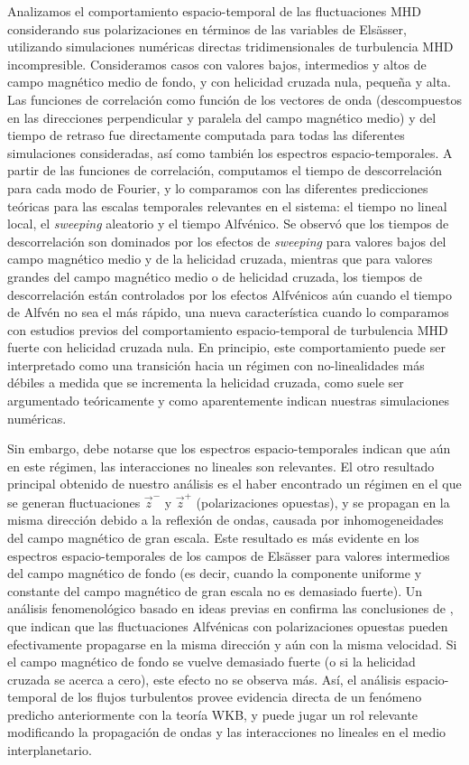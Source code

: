 Analizamos el comportamiento espacio-temporal de las fluctuaciones MHD
considerando sus polarizaciones en términos de las variables de
Els\"asser, utilizando simulaciones numéricas directas
tridimensionales de turbulencia MHD incompresible. Consideramos casos
con valores bajos, intermedios y altos de campo magnético medio de
fondo, y con helicidad cruzada nula, pequeña y alta. Las funciones de
correlación como función de los vectores de onda (descompuestos en las
direcciones perpendicular y paralela del campo magnético medio) y del
tiempo de retraso fue directamente computada para todas las diferentes
simulaciones consideradas, así como también los espectros
espacio-temporales. A partir de las funciones de correlación,
computamos el tiempo de descorrelación para cada modo de Fourier, y lo
comparamos con las diferentes predicciones teóricas para las escalas
temporales relevantes en el sistema: el tiempo no lineal local, el
\textit{sweeping} aleatorio y el tiempo Alfvénico. Se observó que los tiempos
de descorrelación son dominados por los efectos de \textit{sweeping} para
valores bajos del campo magnético medio y de la helicidad cruzada,
mientras que para valores grandes del campo magnético medio o de
helicidad cruzada, los tiempos de descorrelación están controlados por
los efectos Alfvénicos aún cuando el tiempo de Alfvén no sea el más
rápido, una nueva característica cuando lo comparamos con estudios
previos del comportamiento espacio-temporal de turbulencia MHD fuerte
con helicidad cruzada nula. En principio, este comportamiento puede
ser interpretado como una transición hacia un régimen con
no-linealidades más débiles a medida que se incrementa la helicidad
cruzada, como suele ser argumentado teóricamente y como aparentemente
indican nuestras simulaciones numéricas.

Sin embargo, debe notarse que los espectros espacio-temporales indican
que aún en este régimen, las interacciones no lineales son
relevantes. El otro resultado principal obtenido de nuestro análisis
es el haber encontrado un régimen en el que se generan fluctuaciones
$\vec{z}^-$ y $\vec{z}^+$ (polarizaciones opuestas), y se propagan en
la misma dirección debido a la reflexión de ondas, causada por
inhomogeneidades del campo magnético de gran escala. Este resultado es más
evidente en los espectros espacio-temporales de los campos de
Els\"asser para valores intermedios del campo magnético de fondo (es
decir, cuando la componente uniforme y constante del campo magnético
de gran escala no es demasiado fuerte). Un análisis fenomenológico
basado en ideas previas en \cite{zhou1990remarks}
confirma las conclusiones de \cite{hollweg_1990_wkb}, que indican que
las fluctuaciones Alfvénicas con polarizaciones opuestas pueden
efectivamente propagarse en la misma dirección y aún con la misma
velocidad.  Si el campo magnético de fondo se vuelve demasiado fuerte
(o si la helicidad cruzada se acerca a cero), este efecto no se
observa más. Así, el análisis espacio-temporal de los flujos
turbulentos provee evidencia directa de un fenómeno predicho
anteriormente con la teoría WKB, y puede jugar un rol relevante
modificando la propagación de ondas y las interacciones no lineales en
el medio interplanetario.

